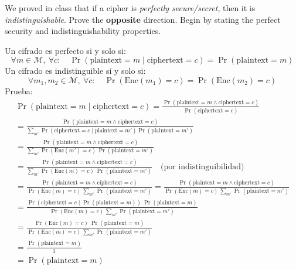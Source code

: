 \documentclass[12pt,addpoints,answers]{exam}
\begin{document}
\begin{questions}
\question[10] We proved in class that if a cipher is {\em perfectly secure/secret}, then it is {\em indistinguishable}. Prove the \textbf{opposite} direction. Begin by stating the perfect security and indistinguishability properties.
\begin{solution}
    Un cifrado es perfecto si y solo si:
    \[
        \forall m \in \mathcal{M}, \ \forall c:\quad 
        \Pr(\text{plaintext} = m \mid \text{ciphertext} = c) = \Pr(\text{plaintext} = m)
    \]
    Un cifrado es indistinguible si y solo si:
    \[
        \forall m_1, m_2 \in \mathcal{M}, \ \forall c:\quad 
        \Pr(\text{Enc}(m_1) = c) = \Pr(\text{Enc}(m_2) = c)
    \]
    Prueba: \\ 
    \begin{align*}
        \Pr(\text{plaintext} = m \mid \text{ciphertext} = c)
        = \frac{\Pr(\text{plaintext} = m \land \text{ciphertext} = c)}{\Pr(\text{ciphertext} = c)} \\ 
        = \frac{\Pr(\text{plaintext} = m \land \text{ciphertext} = c)}{\sum_{m'} \Pr(\text{ciphertext} = c \mid \text{plaintext} = m') \Pr(\text{plaintext} = m')} \\
        = \frac{\Pr(\text{plaintext} = m \land \text{ciphertext} = c)}{\sum_{m'} \Pr(\text{Enc}(m') = c)\, \Pr(\text{plaintext} = m')} \\
        = \frac{\Pr(\text{plaintext} = m \land \text{ciphertext} = c)}{\sum_{m'} \Pr(\text{Enc}(m) = c)\, \Pr(\text{plaintext} = m')} \quad \text{(por indistinguibilidad)} \\
        = \frac{\Pr(\text{plaintext} = m \land \text{ciphertext} = c)}{\Pr(\text{Enc}(m) = c)\, \sum_{m'} \Pr(\text{plaintext} = m')}
        = \frac{\Pr(\text{plaintext} = m \land \text{ciphertext} = c)}{\Pr(\text{Enc}(m) = c)\, \sum_{m'} \Pr(\text{plaintext} = m')} \\
        = \frac{\Pr(\text{ciphertext} = c \mid \Pr(\text{plaintext} = m)) \ \Pr(\text{plaintext} = m)}{\Pr(\text{Enc}(m) = c)\, \sum_{m'} \Pr(\text{plaintext} = m')} \\ 
        = \frac{\Pr(\text{Enc}(m) = c) \ \Pr(\text{plaintext} = m)}{\Pr(\text{Enc}(m) = c)\, \sum_{m'} \Pr(\text{plaintext} = m')} \\ 
        = \frac{\Pr(\text{plaintext} = m)}{1} \\ = \Pr(\text{plaintext} = m)
    \end{align*}
\end{solution}



\end{questions}
\end{document}
